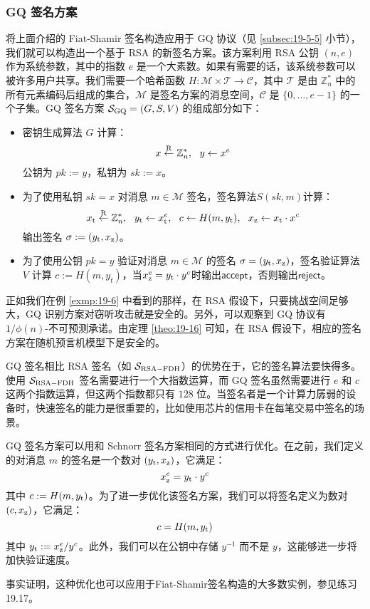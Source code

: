 \subsubsection{GQ 签名方案}

将上面介绍的 Fiat-Shamir 签名构造应用于 GQ 协议（见 \ref{subsec:19-5-5} 小节），我们就可以构造出一个基于 RSA 的新签名方案。该方案利用 RSA 公钥 $(n,e)$ 作为系统参数，其中的指数 $e$ 是一个大素数。如果有需要的话，该系统参数可以被许多用户共享。我们需要一个哈希函数 $H:\mathcal{M}\times\mathcal{T}\to\mathcal{C}$，其中 $\mathcal{T}$ 是由 $\mathbb{Z}_n^*$ 中的所有元素编码后组成的集合，$\mathcal{M}$ 是签名方案的消息空间，$\mathcal{C}$ 是 $\{0,\dots,e-1\}$ 的一个子集。GQ 签名方案 $\mathcal{S}_{\rm GQ}=(G,S,V)$ 的组成部分如下：
\begin{itemize}
	\item 密钥生成算法 $G$ 计算：
	$$
    x\overset{\rm R}\leftarrow\mathbb{Z}_n^*,~~
    y\leftarrow x^e
    $$
	公钥为 $pk:=y$，私钥为 $sk:=x$。
	\item 为了使用私钥 $sk=x$ 对消息 $m\in\mathcal{M}$ 签名，签名算法$S(sk,m)$计算：
    $$
    x_{\rm t}\overset{\rm R}\leftarrow \mathbb{Z}_n^*,~~
    y_{\rm t}\leftarrow x_{\rm t}^e,~~
    c\leftarrow H(m,y_{\rm t}),~~
    x_{\rm z}\leftarrow x_{\rm t}\cdot x^c
    $$
    输出签名 $\sigma:=(y_{\rm t},x_{\rm z})$。
	\item 为了使用公钥 $pk=y$ 验证对消息 $m\in\mathcal{M}$ 的签名  $\sigma=(y_{\rm t},x_{\rm z})$，签名验证算法 $V$ 计算 $c:=H(m,y_t)$，当$x_{\rm z}^e=y_{\rm t}\cdot y^c$时输出$\mathsf{accept}$，否则输出$\mathsf{reject}$。
\end{itemize}    

正如我们在例 \ref{exmp:19-6} 中看到的那样，在 RSA 假设下，只要挑战空间足够大，GQ 识别方案对窃听攻击就是安全的。另外，可以观察到 GQ 协议有 ${1}/{\phi(n)}$-不可预测承诺。由定理 \ref{theo:19-16} 可知，在 RSA 假设下，相应的签名方案在随机预言机模型下是安全的。

GQ 签名相比 RSA 签名（如 $\mathcal{S}_{\rm RSA-FDH}$）的优势在于，它的签名算法要快得多。使用 $\mathcal{S}_{\rm RSA-FDH}$ 签名需要进行一个大指数运算，而 GQ 签名虽然需要进行 $e$ 和 $c$ 这两个指数运算，但这两个指数都只有 $128$ 位。当签名者是一个计算力孱弱的设备时，快速签名的能力是很重要的，比如使用芯片的信用卡在每笔交易中签名的场景。

\begin{snote}[一个优化.]
GQ 签名方案可以用和 Schnorr 签名方案相同的方式进行优化。在之前，我们定义的对消息 $m$ 的签名是一个数对  $(y_{\rm t},x_{\rm z})$，它满足：
$$
x_{\rm z}^e=y_{\rm t}\cdot y^c
$$
其中 $c:=H(m,y_{\rm t})$。为了进一步优化该签名方案，我们可以将签名定义为数对 $(c,x_{\rm z})$，它满足：
$$
c=H(m,y_{\rm t})
$$
其中 $y_{\rm t}:={x_{\rm z}^e}/{y^c}$。此外，我们可以在公钥中存储 $y^{-1}$ 而不是 $y$，这能够进一步将加快验证速度。

事实证明，这种优化也可以应用于Fiat-Shamir签名构造的大多数实例，参见练习 19.17。
\end{snote}
